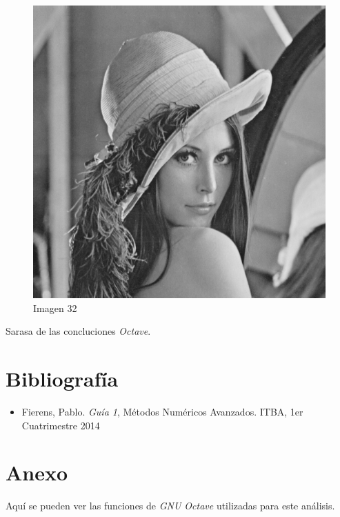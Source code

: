 \documentclass{article}
\begin{document}
\begin{multicols}{2}
\begin{figure}[H]
\centering
\includegraphics[scale=0.2]{../img/lena512.bmp}
\caption{Imagen 32}
\label{Imagen 32}
\end{figure}


\par Sarasa de las concluciones \textit{Octave}.\\

\end{multicols}

\section{Bibliografía} 

\begin{itemize}
  \item Fierens, Pablo. \textit{Guía 1}, Métodos Numéricos Avanzados. ITBA, 1er Cuatrimestre 2014

\end{itemize}

\clearpage

\section{Anexo}
\par Aquí se pueden ver las funciones de \textit{GNU Octave} utilizadas para este análisis.\\
\end{document}

